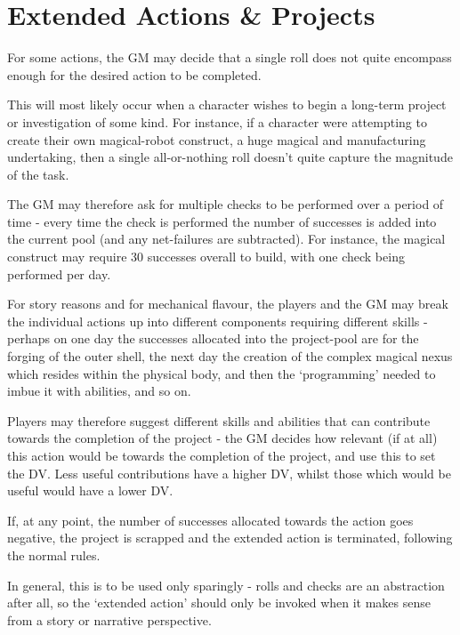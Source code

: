 \section{Extended Actions \& Projects}\label{S:Extended}

For some actions, the GM may decide that a single roll does not quite encompass enough for the desired action to be completed. 

This will most likely occur when a character wishes to begin a long-term project or investigation of some kind. For instance, if a character were attempting to create their own magical-robot construct, a huge magical and manufacturing undertaking, then a single all-or-nothing roll doesn't quite capture the magnitude of the task. 

The GM may therefore ask for multiple checks to be performed over a period of time - every time the check is performed the number of successes is added into the current pool (and any net-failures are subtracted). For instance, the magical construct may require 30 successes overall to build, with one check being performed per day. 
 
 For story reasons and for mechanical flavour, the players and the GM may break the individual actions up into different components requiring different skills - perhaps on one day the successes allocated into the project-pool are for the forging of the outer shell, the next day the creation of the complex magical nexus which resides within the physical body, and then the `programming' needed to imbue it with abilities, and so on. 
 
 Players may therefore suggest different skills and abilities that can contribute towards the completion of the project - the GM decides how relevant (if at all) this action would be towards the completion of the project, and use this to set the DV. Less useful contributions have a higher DV, whilst those which would be useful would have a lower DV.


If, at any point, the number of successes allocated towards the action goes negative, the project is scrapped and the extended action is terminated, following the normal rules.

In general, this is to be used only sparingly - rolls and checks are an abstraction after all, so the `extended action' should only be invoked when it makes sense from a story or narrative perspective. 
